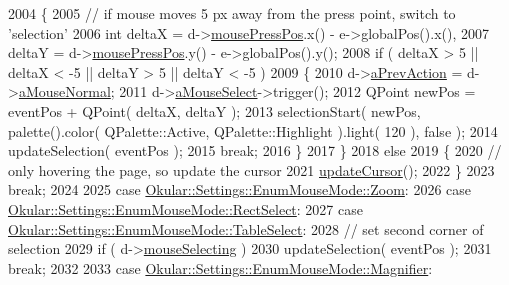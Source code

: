 \begin{DoxyCode}
2004             \{
2005                 \textcolor{comment}{// if mouse moves 5 px away from the press point, switch to 'selection'}
2006                 \textcolor{keywordtype}{int} deltaX = d->\hyperlink{classPageViewPrivate_aa4799ae3aa24957d19a95220d8f61216}{mousePressPos}.x() - e->globalPos().x(),
2007                     deltaY = d->\hyperlink{classPageViewPrivate_aa4799ae3aa24957d19a95220d8f61216}{mousePressPos}.y() - e->globalPos().y();
2008                 \textcolor{keywordflow}{if} ( deltaX > 5 || deltaX < -5 || deltaY > 5 || deltaY < -5 )
2009                 \{
2010                     d->\hyperlink{classPageViewPrivate_a63b5ccd8ed0f4ac9a89c040aeb3173a9}{aPrevAction} = d->\hyperlink{classPageViewPrivate_aad98b5d46ed82c5423f13cd1a10d0253}{aMouseNormal};
2011                     d->\hyperlink{classPageViewPrivate_a9e809032b95484f491dd439198b7bb8e}{aMouseSelect}->trigger();
2012                     QPoint newPos = eventPos + QPoint( deltaX, deltaY );
2013                     selectionStart( newPos, palette().color( QPalette::Active, QPalette::Highlight ).light(
       120 ), \textcolor{keyword}{false} );
2014                     updateSelection( eventPos );
2015                     \textcolor{keywordflow}{break};
2016                 \}
2017             \}
2018             \textcolor{keywordflow}{else}
2019             \{
2020                 \textcolor{comment}{// only hovering the page, so update the cursor}
2021                 \hyperlink{classPageView_a0054ba6d2967fa31dea42dcc9d9020b6}{updateCursor}();
2022             \}
2023             \textcolor{keywordflow}{break};
2024 
2025         \textcolor{keywordflow}{case} \hyperlink{classOkular_1_1Settings_1_1EnumMouseMode_ab2ae04e2d7d069f02195ccf32c52415ba02b6269995c57d3fa3c40c5301591e62}{Okular::Settings::EnumMouseMode::Zoom}:
2026         \textcolor{keywordflow}{case} \hyperlink{classOkular_1_1Settings_1_1EnumMouseMode_ab2ae04e2d7d069f02195ccf32c52415baa9bf3100d0e93abfec2769957743e6a2}{Okular::Settings::EnumMouseMode::RectSelect}:
2027         \textcolor{keywordflow}{case} \hyperlink{classOkular_1_1Settings_1_1EnumMouseMode_ab2ae04e2d7d069f02195ccf32c52415ba5422065f9d7eff6cc08eef755e862af3}{Okular::Settings::EnumMouseMode::TableSelect}:
2028             \textcolor{comment}{// set second corner of selection}
2029             \textcolor{keywordflow}{if} ( d->\hyperlink{classPageViewPrivate_a8819b152a8279b75359af2a3e0567681}{mouseSelecting} )
2030                 updateSelection( eventPos );
2031             \textcolor{keywordflow}{break};
2032 
2033         \textcolor{keywordflow}{case} \hyperlink{classOkular_1_1Settings_1_1EnumMouseMode_ab2ae04e2d7d069f02195ccf32c52415bab95111677f0c566414f48ece94ce0f45}{Okular::Settings::EnumMouseMode::Magnifier}:

\end{DoxyCode}
